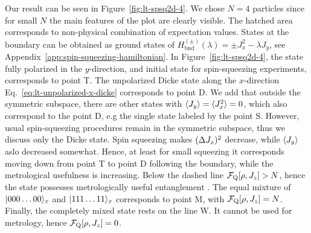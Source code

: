 Our result can be seen in Figure~\ref{fig:lt-spsq2d-4}.
We chose $N=4$ particles since for small $N$ the main features of the plot are clearly visible.
The hatched area corresponds to non-physical combination of expectation values.
States at the boundary can be obtained as ground states of $H_{\text{bnd}}^{(\pm)}(\lambda)=\pm J_x^2 -\lambda J_y$, see Appendix~\ref{app:spin-squeezing-hamiltonian}.
In Figure~\ref{fig:lt-spsq2d-4}, the state fully polarized in the $y$-direction, and initial state for spin-squeezing experiments, corresponds to point T.
The unpolarized Dicke state along the $x$-direction Eq.~\eqref{eq:lt-unpolarized-x-dicke} corresponds to point D.
We add that outside the symmetric subspace, there are other states with $\langle{J_y}\rangle=\langle{J_x^2}\rangle=0$, which also correspond to the point D, e.g the single state labeled by the point S.
However, usual spin-squeezing procedures remain in the symmetric subspace, thus we discuss only the Dicke state.
Spin squeezing makes $(\Delta J_x )^2$ decrease, while $\langle{J_y}\rangle$ aslo decreased somewhat.
Hence, at least for small squeezing it corresponds moving down from point T to point D following the boundary, while the metrological usefulness is increasing.
Below the dashed line $\mathcal{F}_{\textnormal{Q}}[{\textstyle \rho,J_z}]>N$, hence the state possesses metrologically useful entanglement \cite{}.
The equal mixture of $\vert{000\dots00}\rangle_x$ and $\vert{111\dots11}\rangle_x$ corresponds to point M, with $\mathcal{F}_{\textnormal{Q}}[{\textstyle \rho,J_z}] = N$.
Finally, the completely mixed state rests on the line W.
It cannot be used for metrology, hence $\mathcal{F}_{\textnormal{Q}}[{\textstyle \rho,J_z}]=0$.
